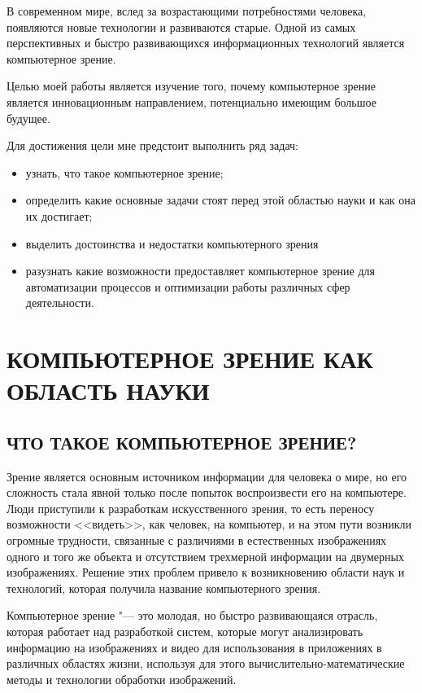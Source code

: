 \documentclass[bachelor, och, referat, times]{SCWorks}
\begin{document}
\tableofcontents

\intro
В современном мире, вслед за возрастающими потребностями человека, появляются новые технологии и развиваются старые. Одной из самых перспективных и быстро развивающихся информационных технологий является компьютерное зрение.

Целью  моей работы является изучение того, почему компьютерное зрение является инновационным направлением, потенциально имеющим большое будущее. 

Для достижения цели мне предстоит выполнить ряд задач:
\begin{itemize}
    \item узнать, что такое компьютерное зрение;
    \item определить какие основные задачи стоят перед этой областью науки и как она их достигает;
    \item выделить достоинства и недостатки компьютерного зрения
    \item разузнать какие возможности предоставляет компьютерное зрение для автоматизации процессов и оптимизации работы различных сфер деятельности.
\end{itemize}

\section{КОМПЬЮТЕРНОЕ ЗРЕНИЕ КАК ОБЛАСТЬ НАУКИ}
\subsection{ЧТО ТАКОЕ КОМПЬЮТЕРНОЕ ЗРЕНИЕ?}
Зрение является основным источником информации для человека о мире, но его сложность стала явной только после попыток воспроизвести его на компьютере. Люди приступили к разработкам искусственного зрения, то есть переносу возможности <<видеть>>, как человек, на компьютер, и на этом пути возникли огромные трудности, связанные с различиями в естественных изображениях одного и того же объекта и отсутствием трехмерной информации на двумерных изображениях. Решение этих проблем привело к возникновению области наук и технологий, которая получила название компьютерного зрения. 

Компьютерное зрение "--- это молодая, но быстро развивающаяся отрасль, которая работает над разработкой систем, которые могут анализировать информацию на изображениях и видео для использования в приложениях в различных областях жизни, используя для этого вычислительно-математические методы и технологии обработки изображений.  
\end{document}
